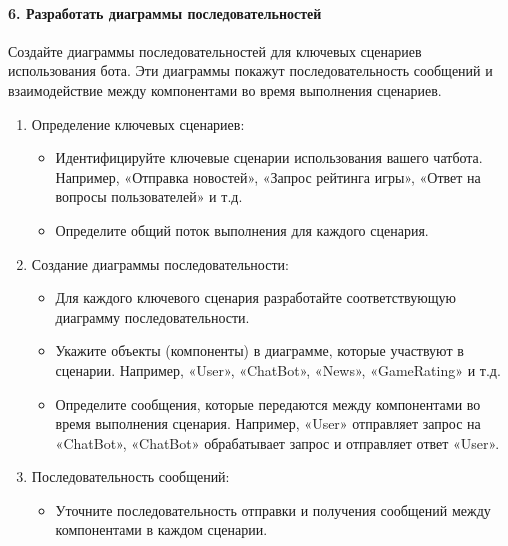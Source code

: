 \documentclass[letterpaper,10pt,russian]{sphinxmanual}
\begin{document}
\paragraph{6. Разработать диаграммы последовательностей}
\label{\detokenize{educational_materials/uml/content:id15}}
\sphinxAtStartPar
Создайте диаграммы последовательностей для ключевых сценариев использования бота. Эти диаграммы покажут последовательность сообщений и взаимодействие между компонентами во время выполнения сценариев.
\begin{enumerate}
%
\item {} 
\sphinxAtStartPar
Определение ключевых сценариев:
\begin{itemize}
\item {} 
\sphinxAtStartPar
Идентифицируйте ключевые сценарии использования вашего чат\sphinxhyphen{}бота. Например, «Отправка новостей», «Запрос рейтинга игры», «Ответ на вопросы пользователей» и т.д.

\item {} 
\sphinxAtStartPar
Определите общий поток выполнения для каждого сценария.

\end{itemize}

\item {} 
\sphinxAtStartPar
Создание диаграммы последовательности:
\begin{itemize}
\item {} 
\sphinxAtStartPar
Для каждого ключевого сценария разработайте соответствующую диаграмму последовательности.

\item {} 
\sphinxAtStartPar
Укажите объекты (компоненты) в диаграмме, которые участвуют в сценарии. Например, «User», «ChatBot», «News», «GameRating» и т.д.

\item {} 
\sphinxAtStartPar
Определите сообщения, которые передаются между компонентами во время выполнения сценария. Например, «User» отправляет запрос на «ChatBot», «ChatBot» обрабатывает запрос и отправляет ответ «User».

\end{itemize}

\item {} 
\sphinxAtStartPar
Последовательность сообщений:
\begin{itemize}
\item {} 
\sphinxAtStartPar
Уточните последовательность отправки и получения сообщений между компонентами в каждом сценарии.


\end{itemize}
\end{enumerate}
\end{document}
